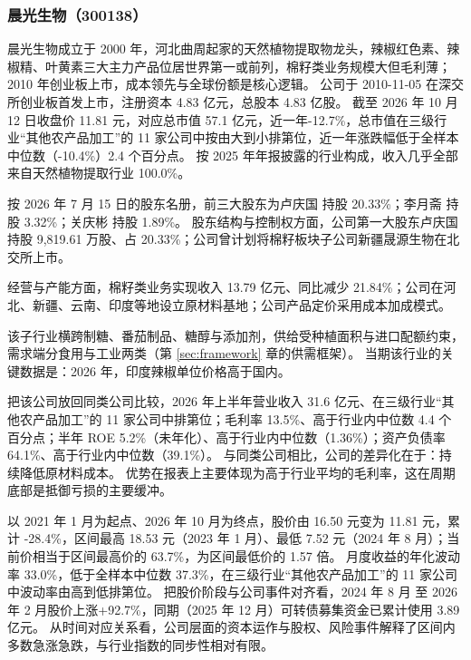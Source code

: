 \subsubsection{晨光生物（300138）}
\label{co:300138}

 晨光生物成立于 2000 年，河北曲周起家的天然植物提取物龙头，辣椒红色素、辣椒精、叶黄素三大主力产品位居世界第一或前列，棉籽类业务规模大但毛利薄；2010 年创业板上市，成本领先与全球份额是核心逻辑。 公司于 2010-11-05 在深交所创业板首发上市，注册资本 4.83 亿元，总股本 4.83 亿股。 截至 2026 年 10 月 12 日收盘价 11.81 元，对应总市值 57.1 亿元，近一年-12.7\%，总市值在三级行业“其他农产品加工”的 11 家公司中按由大到小排第位，近一年涨跌幅低于全样本中位数（-10.4\%）2.4 个百分点。 按 2025 年年报披露的行业构成，收入几乎全部来自天然植物提取行业 100.0\%。

 按 2026 年 7 月 15 日的股东名册，前三大股东为卢庆国 持股 20.33\%；李月斋 持股 3.32\%；关庆彬 持股 1.89\%。 股东结构与控制权方面，公司第一大股东卢庆国持股 9,819.61 万股、占 20.33\%；公司曾计划将棉籽板块子公司新疆晟源生物在北交所上市。

 经营与产能方面，棉籽类业务实现收入 13.79 亿元、同比减少 21.84\%；公司在河北、新疆、云南、印度等地设立原材料基地；公司产品定价采用成本加成模式。

 该子行业横跨制糖、番茄制品、糖醇与添加剂，供给受种植面积与进口配额约束，需求端分食用与工业两类（第 \ref{sec:framework} 章的供需框架）。 当期该行业的关键数据是：2026 年，印度辣椒单位价格高于国内。

 把该公司放回同类公司比较，2026 年上半年营业收入 31.6 亿元、在三级行业“其他农产品加工”的 11 家公司中排第位；毛利率 13.5\%、高于行业内中位数 4.4 个百分点；半年 ROE 5.2\%（未年化）、高于行业内中位数（1.36\%）；资产负债率 64.1\%、高于行业内中位数（39.1\%）。 与同类公司相比，公司的差异化在于：持续降低原材料成本。 优势在报表上主要体现为高于行业平均的毛利率，这在周期底部是抵御亏损的主要缓冲。

 以 2021 年 1 月为起点、2026 年 10 月为终点，股价由 16.50 元变为 11.81 元，累计 -28.4\%，区间最高 18.53 元（2023 年 1 月）、最低 7.52 元（2024 年 8 月）；当前价相当于区间最高价的 63.7\%，为区间最低价的 1.57 倍。 月度收益的年化波动率 33.0\%，低于全样本中位数 37.3\%，在三级行业“其他农产品加工”的 11 家公司中波动率由高到低排第位。 把股价阶段与公司事件对齐看，2024 年 8 月 至 2026 年 2 月股价上涨+92.7\%，同期（2025 年 12 月）可转债募集资金已累计使用 3.89 亿元。 从时间对应关系看，公司层面的资本运作与股权、风险事件解释了区间内多数急涨急跌，与行业指数的同步性相对有限。

